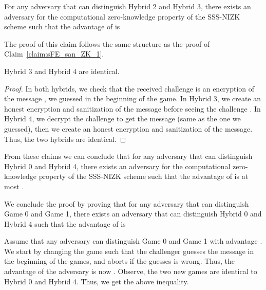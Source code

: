 \documentclass{llncs}
\begin{document}
\begin{claim} \label{claim:sFE_san_ZK_2}
For any adversary  that can distinguish Hybrid 2 and Hybrid 3, there exists an adversary  for the computational zero-knowledge property of the SSS-NIZK scheme such that the advantage of  is 

\end{claim}

The proof of this claim follows the same structure as the proof of Claim~\ref{claim:sFE_san_ZK_1}. 

\begin{claim} \label{claim:sFE_san_identical}
Hybrid 3 and Hybrid 4 are identical. 
\end{claim}

\begin{proof} 
In both hybrids, we check that the received challenge  is an encryption of the message , we guessed in the beginning of the game. 
In Hybrid 3, we create an honest encryption and sanitization of the message  before seeing the challenge . 
In Hybrid 4, we decrypt the challenge  to get the message  (same as the one we guessed), then we create an honest encryption and sanitization of the message. 
Thus, the two hybrids are identical. 
\end{proof}

From these claims we can conclude that for any adversary  that can distinguish Hybrid 0 and Hybrid 4, there exists an adversary  for the computational zero-knowledge property of the SSS-NIZK scheme such that the advantage of  is at most .

We conclude the proof by proving that for any adversary  that can distinguish Game 0 and Game 1, there exists an adversary  that can distinguish Hybrid 0 and Hybrid 4 such that the advantage of  is
	

Assume that any adversary  can distinguish Game 0 and Game 1 with advantage . 
We start by changing the game such that the challenger guesses the message in the beginning of the games, and aborts if the guesses is wrong. Thus, the advantage of the adversary is now .
Observe, the two new games are identical to Hybrid 0 and Hybrid 4. Thus, we get the above inequality.
\end{document}
